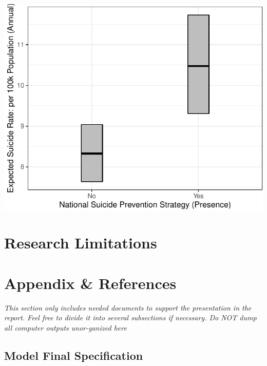 \documentclass[]{article}
\begin{document}
\begin{center}\includegraphics{Project_Report_files/figure-latex/sstrat_plot-1} \end{center}

\section{Research Limitations}\label{research-limitations}

\section{Appendix \& References}\label{appendix-references}

\emph{This section only includes needed documents to support the
presentation in the report. Feel free to divide it into several
subsections if necessary. Do NOT dump all computer outputs unor-ganized
here}

\subsection{Model Final Specification}\label{model-final-specification}
\end{document}
